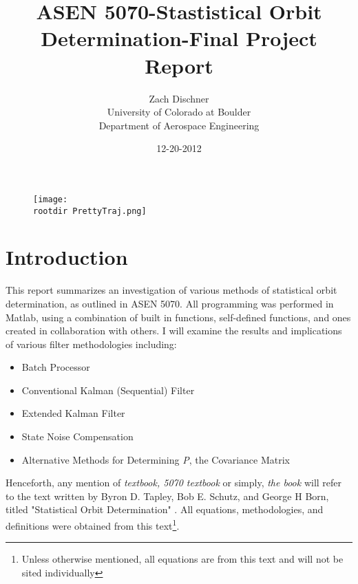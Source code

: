 \documentclass[12pt,a4paper,oneside]{article}
\numberwithin{equation}{section}   		%
\newcommand{\rootdir}{./Figures/}
\begin{document}
\title{ASEN 5070-Stastistical Orbit Determination-Final Project Report}
\author{Zach Dischner \\ University of Colorado at Boulder \\ Department of Aerospace Engineering}
\date{12-20-2012}
\maketitle

\begin{center}
	\begin{figure}[H]
		\texttt{[image: \\rootdir PrettyTraj.png]} 
	\end{figure}
\end{center}


\newpage
\section{Introduction}
This report summarizes an investigation of various methods of statistical orbit determination, as outlined in ASEN 5070. All programming was performed in Matlab, using a combination of built in functions,  self-defined functions, and ones created in collaboration with others. I will examine the results and implications of various filter methodologies including:

\begin{itemize}
	\renewcommand{\labelitemi}{$\bullet$}
	\item Batch Processor
	\item Conventional Kalman (Sequential) Filter
	\item Extended Kalman Filter
	\item State Noise Compensation
	\item Alternative Methods for Determining \emph{P}, the Covariance Matrix
\end{itemize}

Henceforth, any mention of \emph{textbook, 5070 textbook} or simply, \emph{the book} will refer to the text written by Byron D. Tapley, Bob E. Schutz,  and George H Born, titled "Statistical Orbit Determination" \cite{tapley2004statistical}.  All equations, methodologies, and definitions were obtained from this text\footnote{Unless otherwise mentioned, all equations are from this text and will not be sited individually}.
\printnomenclature
\end{document}
